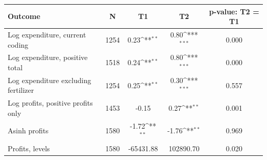 {
\def\sym#1{\ifmmode^{#1}\else\(^{#1}\)\fi}
\begin{tabular}{lcccc}
\hline\hline
Outcome & N & T1 & T2 & p-value: T2 = T1 \\
\hline
Log expenditure, current coding & 1254 & 0.23\sym{**} & 0.80\sym{***} & 0.000 \\
Log expenditure, positive total & 1518 & 0.24\sym{**} & 0.80\sym{***} & 0.000 \\
Log expenditure excluding fertilizer & 1254 & 0.25\sym{**} & 0.30\sym{***} & 0.557 \\
Log profits, positive profits only & 1453 & -0.15 & 0.27\sym{**} & 0.001 \\
Asinh profits & 1580 & -1.72\sym{**} & -1.76\sym{**} & 0.969 \\
Profits, levels & 1580 & -65431.88 & 102890.70 & 0.020 \\
\hline\hline
\end{tabular}
}
